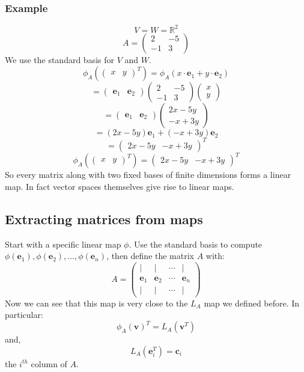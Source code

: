 \documentclass[12pt]{article}
\begin{document}
\subsubsection*{Example}
\[V=W=\mathbb{R}^2\]
\[A=\begin{pmatrix}
    2 & -5 \\
    -1 & 3
\end{pmatrix}\]
We use the standard basis for \(V\) and \(W\).
\[\phi_A(\begin{pmatrix}
    x & y
\end{pmatrix}^T)=\phi_A(x\cdot\textbf{e}_1 + y\cdot\textbf{e}_2)\]
\[=\begin{pmatrix}
    \textbf{e}_1 & \textbf{e}_2
\end{pmatrix}\begin{pmatrix}
    2 & -5 \\
    -1 & 3
\end{pmatrix}\begin{pmatrix}
    x \\ y
\end{pmatrix}\]
\[=\begin{pmatrix}
    \textbf{e}_1 & \textbf{e}_2
\end{pmatrix}\begin{pmatrix}
    2x -5y \\
    -x+3y
\end{pmatrix}\]
\[=(2x-5y)\textbf{e}_1 + (-x+3y)\textbf{e}_2\]
\[=\begin{pmatrix}
    2x-5y & -x+3y
\end{pmatrix}^T\]
\[\phi_A(\begin{pmatrix}
    x & y
\end{pmatrix}^T)=\begin{pmatrix}
    2x-5y & -x+3y
\end{pmatrix}^T\]
So every matrix along with two fixed bases of finite dimensions forms a linear map. In fact vector spaces themselves give rise to linear maps.
\subsection*{Extracting matrices from maps}
Start with a specific linear map \(\phi\). Use the standard basis to compute \(\phi(\textbf{e}_1),\phi(\textbf{e}_2),\dots,\phi(\textbf{e}_n)\), then define the matrix \(A\) with:
\[A=\begin{pmatrix}
    \vert &\vert & \cdots & \vert \\
    \textbf{e}_1 & \textbf{e}_2 & \cdots & \textbf{e}_n \\
    \vert & \vert & \cdots & \vert
\end{pmatrix}\]
Now we can see that this map is very close to the \(L_A\) map we defined before. In particular:
\[\phi_A(\textbf{v})^T=L_A(\textbf{v}^T)\]
and,
\[L_A(\textbf{e}_i^T)=\textbf{c}_i\]
the \(i^{th}\) column of \(A\).
\end{document}
